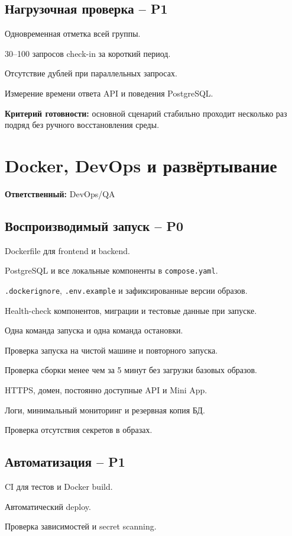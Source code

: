 \documentclass[11pt,a4paper]{article}
\newcommand{\PZero}{\textcolor{PZero}{\textbf{P0}}}
\newcommand{\POne}{\textcolor{POne}{\textbf{P1}}}
\newcommand{\done}[1]{\textbf{Критерий готовности:} #1}
\newcommand{\owner}[1]{\textcolor{Muted}{\textbf{Ответственный:} #1}}
\newcommand{\code}[1]{\texttt{#1}}
\begin{document}
\subsection{Нагрузочная проверка -- \POne}
\begin{tasklist}
  \item Одновременная отметка всей группы.
  \item 30--100 запросов check-in за короткий период.
  \item Отсутствие дублей при параллельных запросах.
  \item Измерение времени ответа API и поведения PostgreSQL.
\end{tasklist}
\done{основной сценарий стабильно проходит несколько раз подряд без ручного восстановления среды.}

\section{Docker, DevOps и развёртывание}
\owner{DevOps/QA}

\subsection{Воспроизводимый запуск -- \PZero}
\begin{tasklist}
  \item Dockerfile для frontend и backend.
  \item PostgreSQL и все локальные компоненты в \code{compose.yaml}.
  \item \code{.dockerignore}, \code{.env.example} и зафиксированные версии образов.
  \item Health-check компонентов, миграции и тестовые данные при запуске.
  \item Одна команда запуска и одна команда остановки.
  \item Проверка запуска на чистой машине и повторного запуска.
  \item Проверка сборки менее чем за 5 минут без загрузки базовых образов.
  \item HTTPS, домен, постоянно доступные API и Mini App.
  \item Логи, минимальный мониторинг и резервная копия БД.
  \item Проверка отсутствия секретов в образах.
\end{tasklist}

\subsection{Автоматизация -- \POne}
\begin{tasklist}
  \item CI для тестов и Docker build.
  \item Автоматический deploy.
  \item Проверка зависимостей и secret scanning.
\end{tasklist}
\end{document}
